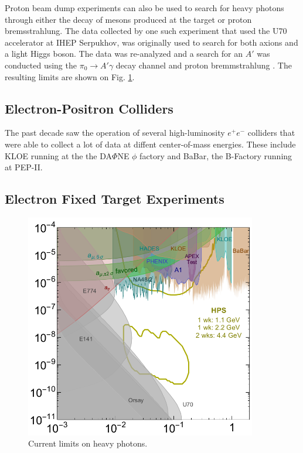 Proton beam dump experiments can also be used to search for heavy photons
through either the decay of mesons produced at the target or proton
bremsstrahlung.  The data collected by one such experiment that used the U70
accelerator at IHEP Serpukhov, was originally used to search for both axions
and a light Higgs boson.  The data was re-analyzed and a search for an $A'$ 
was conducted
using the $\pi_0 \rightarrow A'\gamma$ decay channel and proton bremmstrahlung
\cite{johannes2011, johannes2014}. The resulting limits are shown on Fig. 
\ref{fig:ap_limits}.

\subsection{Electron-Positron Colliders}

The past decade saw the operation of several high-luminosity $e^+e^-$ colliders 
that were able to collect a lot of data at diffent center-of-mass energies.
These include KLOE running at the the DA$\Phi$NE $\phi$ factory and BaBar, 
the B-Factory running at PEP-II.   

\subsection{Electron Fixed Target Experiments}

\begin{figure}[t]
    \centering
    \includegraphics[width=0.9\textwidth]{images/ap_current_limits.png}
    \caption{Current limits on heavy photons.}
    \label{fig:ap_limits}
\end{figure}
